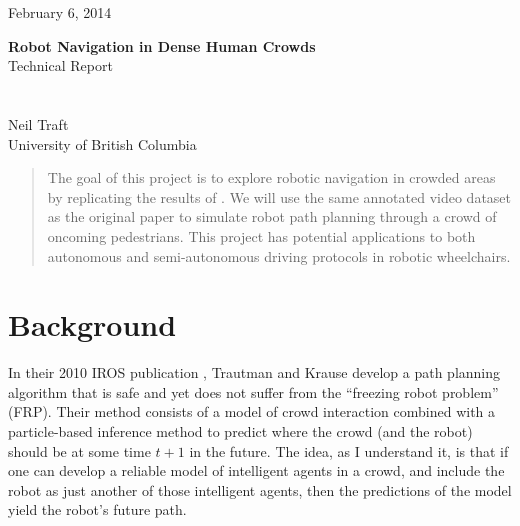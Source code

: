 \documentclass[a4paper,11pt,headings=small]{article}
\begin{document}
  \vspace{-1cm}
	\begin{flushright}
	February 6, 2014\\
	\end{flushright}
	\vspace{0.6cm}
	\LARGE{\textbf{Robot Navigation in Dense Human Crowds}\\[0.2cm] Technical Report}\\\\ \\
	\large{Neil Traft\\[0.1cm] University of British Columbia}		 	 	\vspace{1.3cm}


\pagestyle{fancy}
\fancyhf{}

\setcounter{page}{1}

\renewcommand{\thesection}{\Roman{section}}
\thispagestyle{empty}

\newcommand{\f}{\mathbf{f}}
\newcommand{\fr}{\f^{(R)}}
\newcommand{\fati}{\f^{(i)}}
\newcommand{\fatj}{\f^{(j)}}
\newcommand{\samplej}{(\fatj)_i}
\newcommand{\z}{\mathbf{z}}
\newcommand{\ztot}{\z_{1:t}}

\begin{abstract}
The goal of this project is to explore robotic navigation in crowded areas by replicating the results of \cite{Trautman2010}. We will use the same annotated video dataset as the original paper to simulate robot path planning through a crowd of oncoming pedestrians. This project has potential applications to both autonomous and semi-autonomous driving protocols in robotic wheelchairs.
\end{abstract}


\section*{Background}
\quad In their 2010 IROS publication \cite{Trautman2010}, Trautman and Krause develop a path planning algorithm that is safe and yet does not suffer from the ``freezing robot problem'' (FRP). Their method consists of a model of crowd interaction combined with a particle-based inference method to predict where the crowd (and the robot) should be at some time $t+1$ in the future. The idea, as I understand it, is that if one can develop a reliable model of intelligent agents in a crowd, and include the robot as just another of those intelligent agents, then the predictions of the model yield the robot's future path.
\end{document}
